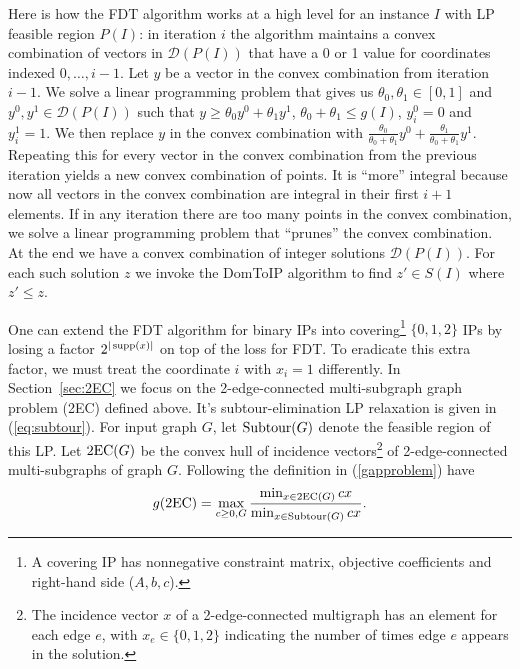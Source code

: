 Here is how the FDT algorithm works at a high level for an instance $I$ with LP feasible region $P(I)$: in iteration $i$ the algorithm maintains a convex combination of  vectors in $\mathcal{D}(P(I))$ that have a 0 or 1 value for coordinates indexed $0,\ldots,i-1$. Let $y$ be a vector in the convex combination from iteration $i-1$. We solve a linear programming problem that gives us $\theta_0,\theta_1\in [0,1]$ and $y^0,y^1\in \mathcal{D}(P(I))$ such that $y\geq \theta_0 y^0 + \theta_1 y^1$, $\theta_0+\theta_1\leq g(I)$, $y^0_i=0$ and $y^1_i=1$. We then replace $y$ in the convex combination with $\frac{\theta_0}{\theta_0+\theta_1}y^0 +\frac{\theta_1}{\theta_0+\theta_1}y^1$.  Repeating this for every vector in the convex combination from the previous iteration yields a new convex combination of points. It is ``more'' integral because now all vectors in the convex combination are integral in their first $i+1$ elements. If in any iteration there are too many points in the convex combination,  we solve a linear programming problem that ``prunes'' the convex combination. At the end we have a convex combination of integer solutions $\mathcal{D}(P(I))$. For each such solution $z$ we invoke the DomToIP algorithm
to find $z'\in S(I)$ where $z'\leq z$.


One can extend the FDT algorithm for binary IPs into covering\footnote{A covering IP has nonnegative constraint matrix, objective coefficients and right-hand side ($A,b,c$).} $\{0,1,2\}$ IPs by losing a factor $2^{|\operatorname{supp}(x)|}$ on top of the loss for FDT. To eradicate this extra factor, we must treat the coordinate $i$ with $x_i=1$ differently. In Section~\ref{sec:2EC} we focus on the 2-edge-connected multi-subgraph graph problem (2EC) defined above.  It's subtour-elimination LP relaxation is given in (\ref{eq:subtour}).
For input graph $G$, let $\operatorname{{Subtour}}(G)$ denote the feasible region of this LP. Let $\2ec(G)$ be the convex hull of incidence vectors\footnote{The incidence vector $x$ of a 2-edge-connected multigraph has an element for each edge $e$, with $x_e \in \{0,1,2\}$ indicating the number of times edge $e$ appears in the solution.} of 2-edge-connected multi-subgraphs of graph $G$. Following the definition in (\ref{gapproblem}) have
\begin{equation}
g(\2ec) = \max_{c\geq 0 , G}\frac{\min_{x\in \2ec(G)} cx}{\min_{x\in \subtour(G)} cx}.
\end{equation}

